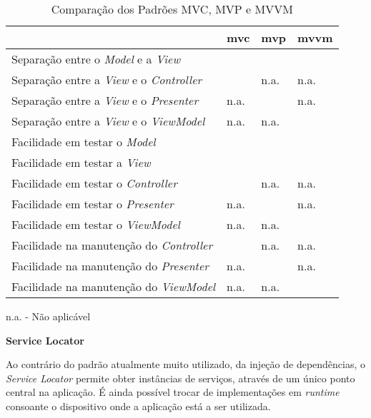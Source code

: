 \begin{table} [H]
	\centering
	\caption{Comparação dos Padrões MVC, MVP e MVVM}\vspace{2mm}
	\label{tab-comparacao-mvc-mvp-mvvm}
	\begin{threeparttable}
    	\begin{tabular}{m{8cm}|C{2cm}|C{2cm}|C{2cm}}
    		\textbf{} & \textbf{\acrshort{mvc}} & \textbf{\acrshort{mvp}} & \textbf{\acrshort{mvvm}}\\
    		\hline Separação entre o \textit{Model} e a \textit{View} & \cmark & \cmark & \cmark \\
    		\hline Separação entre a \textit{View} e o \textit{Controller} & \xmark & n.a. & n.a. \\
    		\hline Separação entre a \textit{View} e o \textit{Presenter} & n.a. & \cmark & n.a. \\
    		\hline Separação entre a \textit{View} e o \textit{ViewModel} & n.a. & n.a. & \cmark \\
    		\hline Facilidade em testar o \textit{Model} & \cmark & \cmark & \cmark \\
    		\hline Facilidade em testar a \textit{View} & \cmark & \cmark & \cmark \\
    		\hline Facilidade em testar o \textit{Controller} & \xmark & n.a. & n.a. \\
    		\hline Facilidade em testar o \textit{Presenter} & n.a. & \cmark & n.a. \\
    		\hline Facilidade em testar o \textit{ViewModel} & n.a. & n.a. & \cmark\\
    		\hline Facilidade na manutenção do \textit{Controller} & \xmark & n.a. & n.a.\\
    		\hline Facilidade na manutenção do \textit{Presenter} & n.a. & \xmark & n.a.\\
    		\hline Facilidade na manutenção do \textit{ViewModel} & n.a. & n.a. & \xmark\\
    	\end{tabular}
    	\begin{tablenotes}
            \centering
            \item[] n.a. - Não aplicável
        \end{tablenotes}
    \end{threeparttable}
\end{table}

\textbf{Service Locator}

Ao contrário do padrão atualmente muito utilizado, da injeção de dependências, o \textit{Service Locator} \cite{ServiceLocator:android} permite obter instâncias de serviços, através de um único ponto central na aplicação. É ainda possível trocar de implementações em \textit{runtime} consoante o dispositivo onde a aplicação está a ser utilizada.



